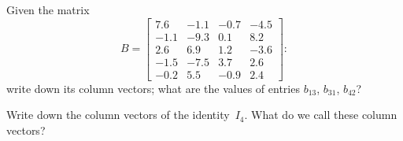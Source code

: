 \begin{exercise} \label{ex:} 
Given the matrix
\begin{equation*}
B=\begin{bmatrix} 7.6&-1.1&-0.7&-4.5
\\  -1.1&-9.3&0.1&8.2
\\   2.6&6.9&1.2&-3.6
\\  -1.5&-7.5&3.7&2.6
\\  -0.2&5.5&-0.9&2.4 \end{bmatrix}:
\end{equation*}
write down its column vectors; what are the values of entries \(b_{13}\), \(b_{31}\), \(b_{42}\)?
\end{exercise}


\begin{exercise} \label{ex:} 
Write down the column vectors of the identity~\(I_4\).
What do we call these column vectors?
\end{exercise}





